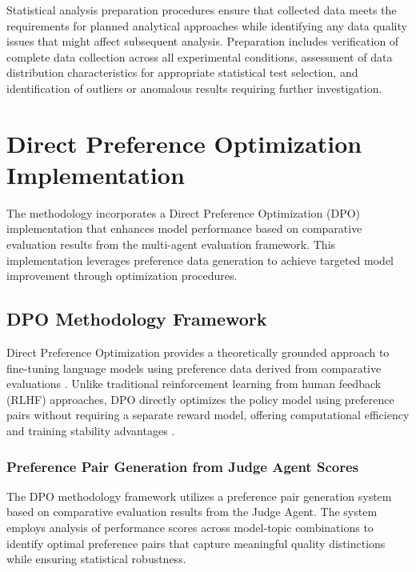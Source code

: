 Statistical analysis preparation procedures ensure that collected data meets the requirements for planned analytical approaches while identifying any data quality issues that might affect subsequent analysis. Preparation includes verification of complete data collection across all experimental conditions, assessment of data distribution characteristics for appropriate statistical test selection, and identification of outliers or anomalous results requiring further investigation.

\section{Direct Preference Optimization Implementation}
\label{sec:dpo-implementation}

The methodology incorporates a Direct Preference Optimization (DPO) implementation that enhances model performance based on comparative evaluation results from the multi-agent evaluation framework. This implementation leverages preference data generation to achieve targeted model improvement through optimization procedures.

\subsection{DPO Methodology Framework}

Direct Preference Optimization provides a theoretically grounded approach to fine-tuning language models using preference data derived from comparative evaluations \cite{rafailov2023dpo, muldrew2024active_preference}. Unlike traditional reinforcement learning from human feedback (RLHF) approaches, DPO directly optimizes the policy model using preference pairs without requiring a separate reward model, offering computational efficiency and training stability advantages \cite{wang2024asft}.

\subsubsection{Preference Pair Generation from Judge Agent Scores}

The DPO methodology framework utilizes a preference pair generation system based on comparative evaluation results from the Judge Agent. The system employs analysis of performance scores across model-topic combinations to identify optimal preference pairs that capture meaningful quality distinctions while ensuring statistical robustness.

